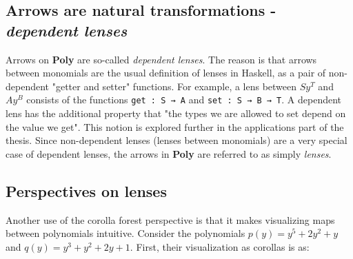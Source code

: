 \subsection{Arrows are natural transformations - \textit{dependent lenses}}

Arrows on \textbf{Poly} are so-called \textit{dependent lenses}.
The reason is that arrows between monomials are the usual definition of lenses in Haskell, as a pair of non-dependent "getter and setter" functions. For example, a lens between $Sy^T$ and $Ay^B$ consists of the functions \texttt{get : S → A} and \texttt{set : S → B → T}. 
A dependent lens has the additional property that "the types we are allowed to set depend on the value we get".
This notion is explored further in the applications part of the thesis. 
Since non-dependent lenses (lenses between monomials) are a very special case of dependent lenses, the arrows in \textbf{Poly} are referred to as simply \textit{lenses}.

\subsection*{Perspectives on lenses}
Another use of the corolla forest perspective is that it makes visualizing maps between polynomials intuitive.
Consider the polynomials $p(y) = y^5 + 2y^2 + y$ and $q(y) = y^3 + y^2 + 2y + 1$.
First, their visualization as corollas is as:


